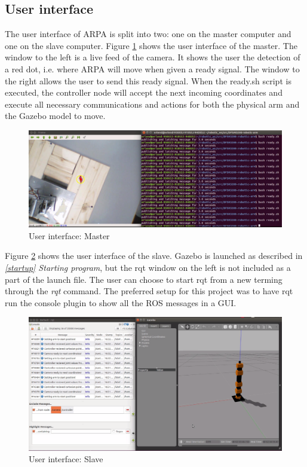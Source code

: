 \documentclass[11pt,a4paper, titlepage]{article}
\begin{document}
	\subsection{User interface}

	The user interface of ARPA is split into two: one on the master computer and one on the slave computer. Figure \ref{fig:ui-master} shows the user interface of the master. The window to the left is a live feed of the camera. It shows the user the detection of a red dot, i.e. where ARPA will move when given a ready signal. The window to the right allows the user to send this ready signal. When the ready.sh script is executed, the controller node will accept the next incoming coordinates and execute all necessary communications and actions for both the physical arm and the Gazebo model to move.
	
	\begin{figure}[H]
		\centering
		\includegraphics[width=0.95\linewidth]{../Diagrams/UI-master.png}
		\caption{User interface: Master}
		\label{fig:ui-master}
	\end{figure}
	
	Figure \ref{fig:ui-slave} shows the user interface of the slave. Gazebo is launched as described in \textit{\ref{startup} Starting program}, but the rqt window on the left is not included as a part of the launch file. The user can choose to start rqt from a new terming through the \textit{rqt} command. The preferred setup for this project was to have rqt run the console plugin to show all the ROS messages in a GUI.
	
	\begin{figure}[H]
		\centering
		\includegraphics[width=0.95\linewidth]{../Diagrams/UI-slave.png}
		\caption{User interface: Slave}
		\label{fig:ui-slave}
	\end{figure}
	
\end{document}
